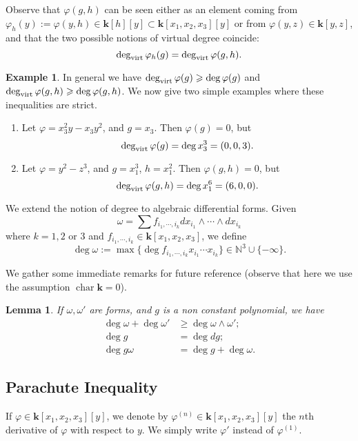 \documentclass[reqno,oneside,11pt]{amsart}
\theoremstyle{plain}
\newtheorem{lemma}[theorem]{Lemma}
\theoremstyle{definition}
\newtheorem{example}[theorem]{Example}
\newcommand{\N}{\mathbb{N}}
\newcommand{\K}{\mathbf{k}}
\DeclareMathOperator{\car}{char}
\renewcommand{\phi}{\varphi}
\newcommand{\dvirt}{\deg_{\text{\rm virt}}}
\renewcommand{\ge}{\geqslant}
\begin{document}
Observe that $\phi(g,h)$ can be seen either as an element coming from 
$\phi_h(y) := \phi(y,h) \in \K[h][y] \subset \K[x_1,x_2,x_3][y]$ or from $\phi(y,z) \in \K[y,z]$, and that the two possible notions of virtual degree coincide:
$$\dvirt \phi_h(g) =\dvirt \phi(g,h).$$

\begin{example}
In general we have $\dvirt \phi(g) \ge \deg \phi(g)$ and $\dvirt \phi(g,h) \ge \deg \phi(g,h)$.
We now give two simple examples where these inequalities are strict.
\begin{enumerate}
\item Let $\phi = x_3^2 y - x_3 y^2$, and $g= x_3$.
Then $\phi(g) = 0$, but
$$\dvirt \phi(g) = \deg x_3^3 = (0,0,3).$$
\item Let $\phi = y^2 - z^3$, and $g = x_1^3$, $h = x_1^2$.
Then $\phi(g,h) = 0$, but
$$\dvirt \phi(g,h) = \deg x_1^6 = (6,0,0).$$
\end{enumerate}
\end{example}

We extend the notion of degree to algebraic differential forms.
Given
$$\omega = \sum f_{i_1,\cdots,i_k} dx_{i_1} \wedge \cdots \wedge dx_{i_k}$$
where $k = 1,2$ or $3$ and $f_{i_1,\cdots,i_k} \in \K[x_1,x_2,x_3]$,
we define
$$\deg \omega := \max \{ \deg f_{i_1,\cdots,i_k} x_{i_1} \cdots x_{i_k}\} \in \N^3 \cup \{-\infty \}.$$

We gather some immediate remarks for future reference (observe that here we use the assumption $\car  \K = 0$).

\begin{lemma} \label{lem:basics forms}
If $\omega, \omega'$ are forms, and $g$ is a non constant polynomial, we have
\begin{align*}
\deg \omega + \deg \omega' &\ge \deg \omega \wedge \omega' ; \\
\deg g &= \deg dg; \\
\deg g \omega &= \deg g + \deg \omega.
\end{align*}
\end{lemma}

\subsection{Parachute Inequality} \label{sec:parachute}

If $\phi \in \K[x_1, x_2, x_3][y]$, we denote by $\phi^{(n)} \in \K[x_1, x_2,
x_3][y] $ the $n$th derivative of $\phi$ with respect to $y$.
We simply write $\phi'$ instead of $\phi^{(1)}$.
\end{document}

